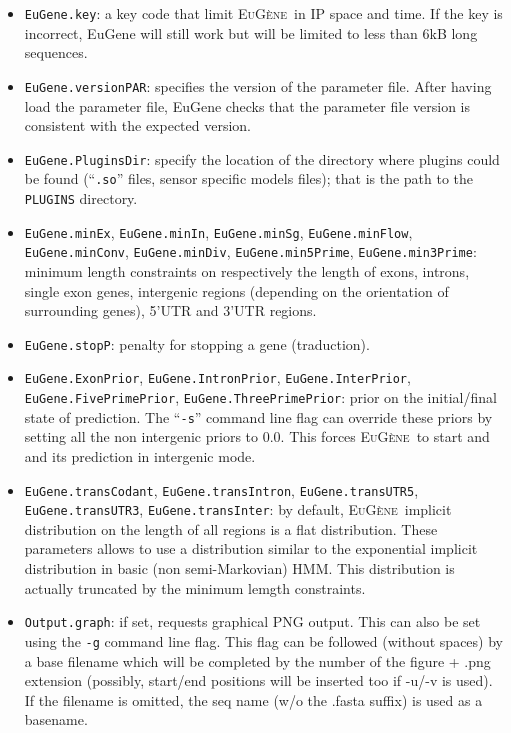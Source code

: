 \documentclass[a4paper,titlepage]{report}
\newcommand{\EuGenie}{\textsc{EuG\`ene}}
\begin{document}
\begin{itemize}
\item \texttt{EuGene.key}: a key code that limit \EuGenie\ in IP space
  and time. If the key is incorrect, EuGene will still work but will
  be limited to less than 6kB long sequences.
  
\item \texttt{EuGene.versionPAR}: specifies the version of the
  parameter file. After having load the parameter file, EuGene checks
  that the parameter file version is consistent with the expected
  version.
  
\item \texttt{EuGene.PluginsDir}: specify the location of the directory
  where plugins could be found (``\texttt{.so}'' files, sensor specific 
  models files); that is the path to the \texttt{PLUGINS} directory.

\item \texttt{EuGene.minEx}, \texttt{EuGene.minIn},
  \texttt{EuGene.minSg}, \texttt{EuGene.minFlow},
  \texttt{EuGene.minConv}, \texttt{EuGene.minDiv},
  \texttt{EuGene.min5Prime}, \texttt{EuGene.min3Prime}: minimum length
  constraints on respectively the length of exons, introns, single
  exon genes, intergenic regions (depending on the orientation of
  surrounding genes), 5'UTR and 3'UTR regions.
  
\item \texttt{EuGene.stopP}: penalty for stopping a gene (traduction).
  
\item \texttt{EuGene.ExonPrior}, \texttt{EuGene.IntronPrior},
  \texttt{EuGene.InterPrior}, \texttt{EuGene.FivePrimePrior},
  \texttt{EuGene.ThreePrimePrior}: prior on the initial/final state of
  prediction. The ``\texttt{-s}'' command line flag can override these
  priors by setting all the non intergenic priors to $0.0$. This
  forces \EuGenie\ to start and and its prediction in intergenic mode.
  
\item \texttt{EuGene.transCodant}, \texttt{EuGene.transIntron},
  \texttt{EuGene.transUTR5}, \texttt{EuGene.transUTR3},
  \texttt{EuGene.transInter}: by default, \EuGenie\ implicit
  distribution on the length of all regions is a flat distribution.
  These parameters allows to use a distribution similar to the
  exponential implicit distribution in basic (non semi-Markovian) HMM.
  This distribution is actually truncated by the minimum lemgth
  constraints.
  
\item \texttt{Output.graph}: if set, requests graphical PNG output.
  This can also be set using the \texttt{-g} command line flag. This
  flag can be followed (without spaces) by a base filename which will
  be completed by the number of the figure + .png extension (possibly,
  start/end positions will be inserted too if -u/-v is used). If the
  filename is omitted, the seq name (w/o the .fasta suffix) is used as
  a basename.
  

\end{itemize}
\end{document}
